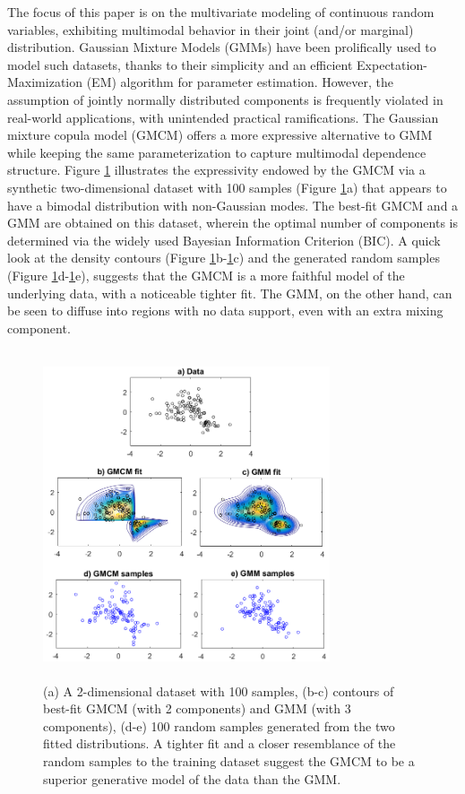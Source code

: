\documentclass{article}
\theoremstyle{plain}
\theoremstyle{definition}
\theoremstyle{remark}
\begin{document}
The focus of this paper is on the multivariate modeling of continuous random variables, exhibiting multimodal behavior in their  joint (and/or marginal) distribution. Gaussian Mixture Models (GMMs) \citep{Bilmes98agentle} have been prolifically used to model such datasets, thanks to their simplicity and an efficient Expectation-Maximization (EM) algorithm for parameter estimation. However, the assumption of jointly normally distributed components is frequently violated in real-world applications, with unintended practical ramifications. The Gaussian mixture copula model (GMCM) \citep{Tewari2011,Bilgrau2016,Bhattacharya2014, kasa2018} offers a more expressive alternative to GMM while keeping the same parameterization to capture multimodal dependence structure. Figure \ref{fig:motivating_example_gmcm} illustrates the expressivity endowed by the GMCM via a synthetic two-dimensional dataset with 100 samples (Figure \ref{fig:motivating_example_gmcm}a) that appears to have a bimodal distribution with non-Gaussian modes. The best-fit GMCM and a GMM are obtained on this dataset, wherein the optimal number of components is determined via the widely used Bayesian Information Criterion (BIC). A quick look at the density contours (Figure \ref{fig:motivating_example_gmcm}b-\ref{fig:motivating_example_gmcm}c) and the generated random samples (Figure \ref{fig:motivating_example_gmcm}d-\ref{fig:motivating_example_gmcm}e), suggests that the GMCM is a more faithful model of the underlying data, with a noticeable tighter fit. The GMM, on the other hand, can be seen to diffuse into regions with no data support, even with an extra mixing component.

\begin{figure}[ht]
\centering
\includegraphics[width= 240pt,height=275pt]{figures/figure_for_motivating_gmcm}
\caption{(a) A 2-dimensional dataset with 100 samples, (b-c) contours of best-fit GMCM (with 2 components) and GMM (with 3 components), (d-e) 100 random samples generated from the two fitted distributions. A tighter fit and a closer resemblance of the random samples to the training dataset suggest the GMCM to be a superior generative model of the data than the GMM.}
\label{fig:motivating_example_gmcm}
\end{figure}
\end{document}
